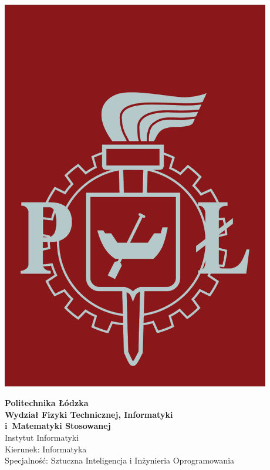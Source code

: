 \begin{titlepage}

\noindent
\begin{minipage}{0.19\textwidth}
\begin{flushleft}
\includegraphics[width=0.88\textwidth]{images/logo}
\end{flushleft}
\end{minipage}
\begin{minipage}[t][][t]{0.81\textwidth}
\begin{flushleft}
\vspace{-3.5\baselineskip}
\textbf{{\large Politechnika Łódzka}\\}
\vspace{\medskipamount}
\textbf{\large Wydział Fizyki Technicznej, Informatyki\\i~Matematyki Stosowanej}
\vspace{\medskipamount}\\
Instytut Informatyki
\\
Kierunek: Informatyka
\\
Specjalność: Sztuczna Inteligencja i Inżynieria Oprogramowania
\\
\end{flushleft}
\end{minipage}
\vspace{2.5cm}


\end{titlepage}
